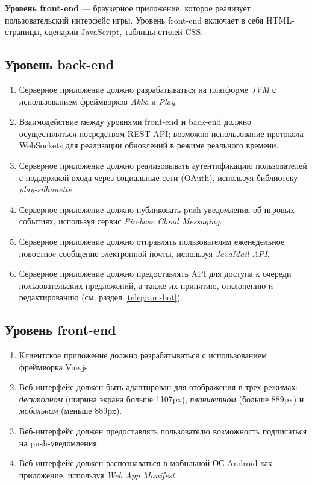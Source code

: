 \documentclass[12pt, a4paper]{article}
\begin{document}
\textbf{Уровень front-end} — браузерное приложение, которое реализует
пользовательский интерфейс игры. Уровень front-end включает в себя
HTML-страницы, сценарии JavaScript, таблицы стилей CSS.

\subsection{Уровень back-end}

\begin{enumerate}
\item Серверное приложение должно разрабатываться на платформе \textit{JVM}
с использованием фреймворков \textit{Akka} и \textit{Play}.
\item Взаимодействие между уровнями front-end и back-end должно осуществляться
посредством REST API; возможно использование протокола WebSockets для реализации
обновлений в режиме реального времени.
\item Серверное приложение должно реализовывать аутентификацию пользователей
с поддержкой входа через социальные сети (OAuth), используя библиотеку
\textit{play-silhouette}.
\item Серверное приложение должно публиковать push-уведомления об игровых событиях,
используя сервис \textit{Firebase Cloud Messaging}.
\item Серверное приложение должно отправлять пользователям еженедельное новостноe
сообщение электронной почты, используя \textit{JavaMail API}.
\item Серверное приложение должно предоставлять API для доступа к очереди
пользовательских предложений, а также их принятию, отклонению и редактированию
(см. раздел \ref{telegram-bot}).
\end{enumerate}

\subsection{Уровень front-end}

\begin{enumerate}
\item Клиентское приложение должно разрабатываться с использованием фреймворка Vue.js.
\item Веб-интерфейс должен быть адаптирован для отображения в трех режимах:
\textit{десктопном} (ширина экрана больше 1107px),
\textit{планшетном} (больше 889px) и \textit{мобильном} (меньше 889px).
\item Веб-интерфейс должен предоставлять пользователю возможность подписаться на
push-уведомления.
\item Веб-интерфейс должен распознаваться в мобильной ОС Android как
приложение, используя \textit{Web App Manifest}.
\end{enumerate}
\end{document}
